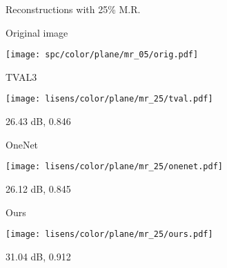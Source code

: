 \documentclass[journal,twoside]{IEEEtran}
\begin{document}
\begin{figure*}[t]
\begin{minipage}{.01\textwidth}
\raggedleft
\begin{turn}{90}Reconstructions with 25\% M.R. \end{turn}
\end{minipage}
\begin{minipage}{.98\textwidth}
\centering
\begin{minipage}{.20\textwidth}
\centerline{Original image}
\vspace{0.01cm}
\texttt{[image: spc/color/plane/mr\_05/orig.pdf]}  
\centerline{}
\end{minipage}\hspace{0.1cm}
\begin{minipage}{.20\textwidth}
\centerline{TVAL3}
\vspace{0.01cm}
\texttt{[image: lisens/color/plane/mr\_25/tval.pdf]}  
\centerline{ 26.43 dB, 0.846}
\end{minipage}\hspace{0.1cm}
\begin{minipage}{.20\textwidth}
\centerline{OneNet}
\vspace{0.1cm}
\texttt{[image: lisens/color/plane/mr\_25/onenet.pdf]}  
  
\centerline{ 26.12 dB, 0.845}
\end{minipage}\hspace{0.1cm}
\begin{minipage}{.20\textwidth}
\centerline{Ours}
\vspace{0.1cm}
\texttt{[image: lisens/color/plane/mr\_25/ours.pdf]}  
\centerline{ 31.04 dB, 0.912}
\end{minipage}\\



\end{minipage}
\end{figure*}
\end{document}
